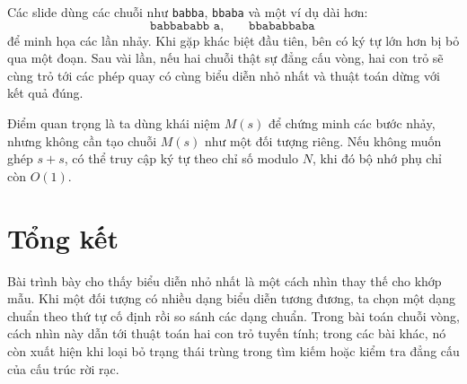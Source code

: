 \documentclass[11pt]{article}
\begin{document}
Các slide dùng các chuỗi như \texttt{babba}, \texttt{bbaba} và một ví dụ dài
hơn:
\[
  \texttt{babbababb a},\qquad
  \texttt{bbababbaba}
\]
để minh họa các lần nhảy. Khi gặp khác biệt đầu tiên, bên có ký tự lớn hơn
bị bỏ qua một đoạn. Sau vài lần, nếu hai chuỗi thật sự đẳng cấu vòng, hai con
trỏ sẽ cùng trỏ tới các phép quay có cùng biểu diễn nhỏ nhất và thuật toán
dừng với kết quả đúng.

Điểm quan trọng là ta dùng khái niệm \(M(s)\) để chứng minh các bước nhảy,
nhưng không cần tạo chuỗi \(M(s)\) như một đối tượng riêng. Nếu không muốn
ghép \(s+s\), có thể truy cập ký tự theo chỉ số modulo \(N\), khi đó bộ nhớ
phụ chỉ còn \(O(1)\).

\section{Tổng kết}

Bài trình bày cho thấy biểu diễn nhỏ nhất là một cách nhìn thay thế cho khớp
mẫu. Khi một đối tượng có nhiều dạng biểu diễn tương đương, ta chọn một dạng
chuẩn theo thứ tự cố định rồi so sánh các dạng chuẩn. Trong bài toán chuỗi
vòng, cách nhìn này dẫn tới thuật toán hai con trỏ tuyến tính; trong các bài
khác, nó còn xuất hiện khi loại bỏ trạng thái trùng trong tìm kiếm hoặc kiểm
tra đẳng cấu của cấu trúc rời rạc.
\end{document}
